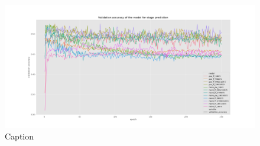 \begin{figure}
    \centering
    \includegraphics[width=\linewidth]{images/val_acc_st.png}
    \caption{Caption}
    \label{fig:val_acc_st}
\end{figure}